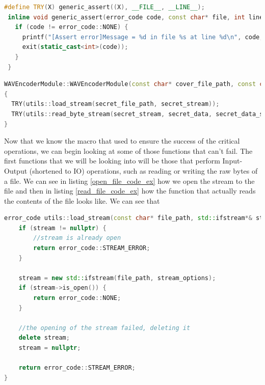 \begin{lstlisting}[language=C++, caption=The TRY macro used for any critical operation,label={lst:try_macro}]
 #define TRY(X) generic_assert((X), __FILE__, __LINE__);
 inline void generic_assert(error_code code, const char* file, int line) {
   if (code != error_code::NONE) {
     printf("[Assert error]Message = %d in file %s at line %d\n", code, file, line);
     exit(static_cast<int>(code));
   }
 }
\end{lstlisting}

\begin{lstlisting}[language=C++, caption=Usage example of the TRY macro,label={lst:try_macro_example}]
WAVEncoderModule::WAVEncoderModule(const char* cover_file_path, const char* secret_file_path) : WAVModule(cover_file_path) 
{
  TRY(utils::load_stream(secret_file_path, secret_stream));
  TRY(utils::read_byte_stream(secret_stream, secret_data, secret_data_size));
}
\end{lstlisting}

Now that we know the macro that used to ensure the success of the critical operations, we can begin looking at some of those functions that can't fail. The first functions that we will be looking into will be those that perform Input-Output (shortened to IO) operations, such as reading or writing the raw bytes of a file. We can see in listing \ref{open_file_code_ex} how we open the stream to the file and then in listing \ref{read_file_code_ex} how the function that actually reads the contents of the file looks like. We can see that 

\begin{lstlisting}[language=C++, caption=The TRY macro used for any critical operation,label={lst:open_file_code_ex}]
error_code utils::load_stream(const char* file_path, std::ifstream*& stream, std::ios_base::openmode stream_options) {
	if (stream != nullptr) {
		//stream is already open
		return error_code::STREAM_ERROR;
	}

	stream = new std::ifstream(file_path, stream_options);
	if (stream->is_open()) {
		return error_code::NONE;
	}

	//the opening of the stream failed, deleting it
	delete stream;
	stream = nullptr;

	return error_code::STREAM_ERROR;
}
\end{lstlisting}


